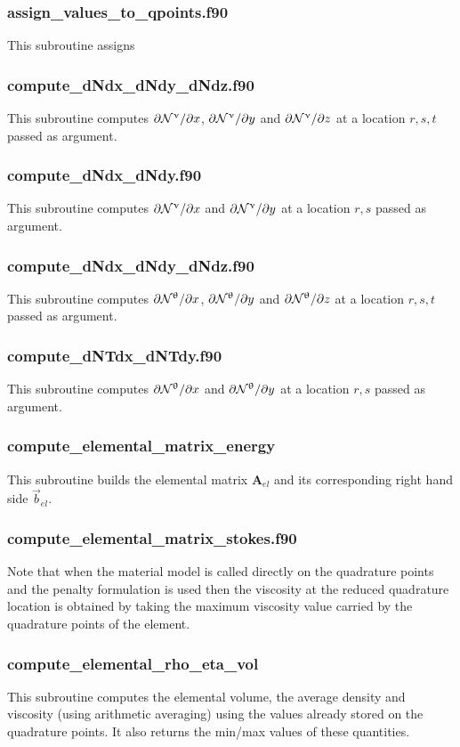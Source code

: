  \subsubsection{assign\_values\_to\_qpoints.f90}
 This subroutine assigns 
 \subsubsection{compute\_dNdx\_dNdy\_dNdz.f90}
 This subroutine computes $\partial{{\mathcal{N}}^\upnu}/\partial x$, $\partial{{\mathcal{N}}^\upnu}/\partial y$ and
 $\partial{{\mathcal{N}}^\upnu}/\partial z$ at a location $r,s,t$ passed as argument.
 \subsubsection{compute\_dNdx\_dNdy.f90}
 This subroutine computes $\partial{{\mathcal{N}}^\upnu}/\partial x$ and $\partial{{\mathcal{N}}^\upnu}/\partial y$
 at a location $r,s$ passed as argument.
 \subsubsection{compute\_dNdx\_dNdy\_dNdz.f90}
 This subroutine computes $\partial{{\mathcal{N}}^\uptheta}/\partial x$, 
 $\partial{{\mathcal{N}}^\uptheta}/\partial y$ and
 $\partial{{\mathcal{N}}^\uptheta}/\partial z$ at a location $r,s,t$ passed as argument.
 \subsubsection{compute\_dNTdx\_dNTdy.f90}
 This subroutine computes $\partial{{\mathcal{N}}^\uptheta}/\partial x$ 
 and $\partial{{\mathcal{N}}^\uptheta}/\partial y$  at a location $r,s$ passed as argument.
 \subsubsection{compute\_elemental\_matrix\_energy}
 This subroutine builds the elemental matrix ${\bm A}_{el}$ and its corresponding 
 right hand side $\vec{b}_{el}$. 
 \subsubsection{compute\_elemental\_matrix\_stokes.f90}
 Note that when the material model is called directly on the quadrature points and 
 the penalty formulation is used then the viscosity at the reduced quadrature location 
 is obtained by taking the maximum viscosity value carried by the quadrature points of 
 the element. 
 \subsubsection{compute\_elemental\_rho\_eta\_vol}
 This subroutine computes the elemental volume, the average density and 
 viscosity (using arithmetic averaging) using the values already stored on the quadrature points. 
 It also returns the min/max values of these quantities.
